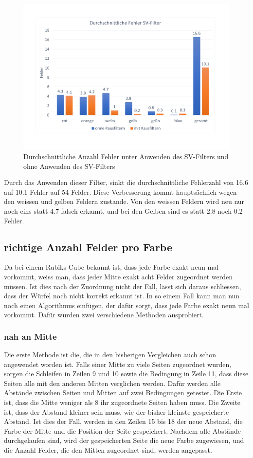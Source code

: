 \documentclass[a4paper, 12pt]{article}
\begin{document}
\begin{figure}[H]
\includegraphics[scale=0.4]{Fehler_SV_Filter} 
\caption{Durchschnittliche Anzahl Fehler unter Anwenden des SV-Filters und ohne Anwenden des SV-Filters}
\end{figure}
Durch das Anwenden dieser Filter, sinkt die durchschnittliche Fehlerzahl von 16.6 auf 10.1 Fehler auf 54 Felder. Diese Verbesserung kommt hauptsächlich wegen den weissen und gelben Feldern zustande. Von den weissen Feldern wird neu nur noch eins statt 4.7 falsch erkannt, und bei den Gelben sind es statt 2.8 noch 0.2 Fehler.
\subsection{richtige Anzahl Felder pro Farbe}
Da bei einem Rubiks Cube bekannt ist, dass jede Farbe exakt neun mal vorkommt, weiss man, dass jeder Mitte exakt acht Felder zugeordnet werden müssen. Ist dies nach der Zuordnung nicht der Fall, lässt sich daraus schliessen, dass der Würfel noch nicht korrekt erkannt ist. In so einem Fall kann man nun noch einen Algorithmus einfügen, der dafür sorgt, dass jede Farbe exakt neun mal vorkommt. Dafür wurden zwei verschiedene Methoden ausprobiert.
\subsubsection{nah an Mitte}
Die erste Methode ist die, die in den bisherigen Vergleichen auch schon angewendet worden ist. Falls einer Mitte zu viele Seiten zugeordnet wurden, sorgen die Schleifen in Zeilen 9 und 10 sowie die Bedingung in Zeile 11, dass diese Seiten alle mit den anderen Mitten verglichen werden. Dafür werden alle Abstände zwischen Seiten und Mitten auf zwei Bedingungen getestet. Die Erste ist, dass die Mitte weniger als 8 ihr zugeordnete Seiten haben muss. Die Zweite ist, dass der Abstand kleiner sein muss, wie der bisher kleinste gespeicherte Abstand. Ist dies der Fall, werden in den Zeilen 15 bis 18 der neue Abstand, die Farbe der Mitte und die Position der Seite gespeichert. Nachdem alle Abstände durchgelaufen sind, wird der gespeicherten Seite die neue Farbe zugewiesen, und die Anzahl Felder, die den Mitten zugeordnet sind, werden angepasst.

\end{document}
